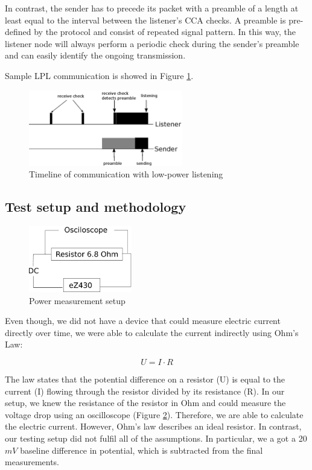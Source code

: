 In contrast, the sender has to precede its packet with a preamble of a length at least equal to the interval between the listener's CCA checks.
A preamble is pre-defined by the protocol and consist of repeated signal pattern.
In this way, the listener node will always perform a periodic check during the sender's preamble and can easily identify the ongoing transmission.

Sample LPL communication is showed in Figure \ref{fig:low_power_listening}.

\begin{figure}[h]
  \centering
  \includegraphics[width=0.6\textwidth]{diagrams/low_power_listening.eps}
  \caption{Timeline of communication with low-power listening}
  \label{fig:low_power_listening}
\end{figure}

\subsection{Test setup and methodology}

\begin{figure}[h]
  \centering
  \includegraphics[width=0.4\textwidth]{diagrams/power.eps}
  \caption{Power measurement setup}
  \label{fig:power}
\end{figure}

Even though, we did not have a device that could measure electric current directly over time, we were able to calculate the current indirectly using Ohm's Law: 

$$
U = I \cdot R
$$

The law states that the potential difference on a resistor (U) is equal to the current (I) flowing through the resistor divided by its resistance (R).
In our setup, we knew the resistance of the resistor in Ohm and could measure the voltage drop using an oscilloscope (Figure \ref{fig:power}).
Therefore, we are able to calculate the electric current.
However, Ohm's law describes an ideal resistor.
In contrast, our testing setup did not fulfil all of the assumptions.
In particular, we a got a 20 $mV$ baseline difference in potential, which is subtracted from the final measurements.

